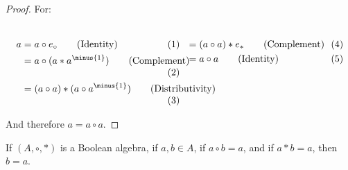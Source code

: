     \begin{proof}
        For:
        \par\vspace{-2.5ex}
        \begin{subequations}
            \begin{minipage}[t]{0.49\textwidth}
                \centering
                \begin{align}
                    a&=a\circ{e}_{\circ}
                    \tag{Identity}\\
                    &=a\circ(a*a^{\minus{1}})
                    \tag{Complement}\\
                    &=(a\circ{a})*(a\circ{a}^{\minus{1}})
                    \tag{Distributivity}
                \end{align}
            \end{minipage}
            \hfill
            \begin{minipage}[t]{0.49\textwidth}
                \centering
                \begin{align}
                    &=(a\circ{a})*{e}_{*}
                    \tag{Complement}\\
                    &=a\circ{a}\tag{Identity}
                \end{align}
            \end{minipage}
        \end{subequations}
        \par\vspace{2.5ex}
        And therefore $a=a\circ{a}$.
    \end{proof}
    \begin{theorem}
        \label{thm:Bool_Alg_aob_equal_a_acb_equal_a_implies_a_equal_b}%
        If $(A,\circ,*)$ is a Boolean algebra, if $a,b\in{A}$, if $a\circ{b}=a$,
        and if $a*b=a$, then $b=a$.
    \end{theorem}
